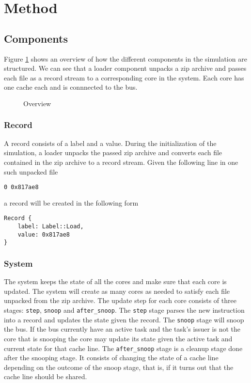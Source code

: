 \section{Method}

\subsection{Components}
Figure \ref{fig:overview} shows an overview of how the different components in the simulation are
structured. We can see that a loader component unpacks a zip archive and passes each file as a
record stream to a corresponding core in the system. Each core has one cache each and is connnected
to the bus.

\begin{figure}[ht]
    \centering
    \caption{Overview}
    \label{fig:overview}
\end{figure}



\subsubsection{Record}

A record consists of a label and a value.  During the initialization of the simulation, a loader
unpacks the passed zip archive and converts each file contained in the zip archive to a record
stream.  Given the following line in one such unpacked file
\begin{lstlisting}[float,floatplacement=H]
0 0x817ae8
\end{lstlisting}
a record will be created in the following form
\begin{lstlisting}[float,floatplacement=H]
Record {
    label: Label::Load,
    value: 0x817ae8
}
\end{lstlisting}


\subsubsection{System}
The system keeps the state of all the cores and make sure that each core is updated.  The system
will create as many cores as needed to satisfy each file unpacked from the zip archive.  The update
step for each core consists of three stages: \texttt{step}, \texttt{snoop} and
\texttt{after\_snoop}.  The \texttt{step} stage parses the new instruction into a record and updates
the state given the record.  The \texttt{snoop} stage will snoop the bus.  If the bus currently have
an active task and the task's issuer is not the core that is snooping the core may update its state
given the active task and current state for that cache line.  The \texttt{after\_snoop} stage is a
cleanup stage done after the snooping stage.  It consists of changing the state of a cache line
depending on the outcome of the snoop stage, that is, if it turns out that the cache line should be
shared.

